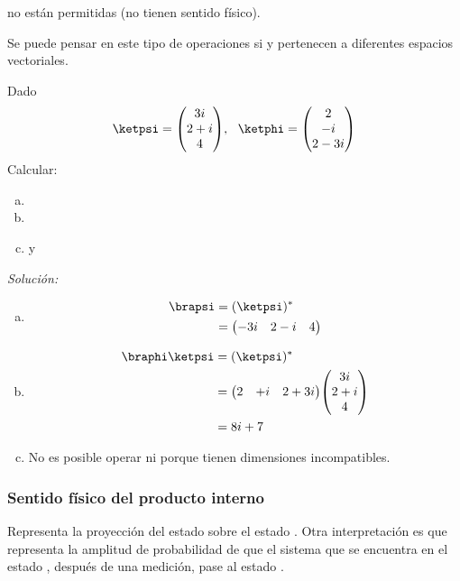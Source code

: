 no están permitidas (no tienen sentido físico).

Se puede pensar en este tipo de operaciones si \ketpsi y \ketphi pertenecen a diferentes espacios vectoriales.

\begin{example}[Operadores]
    Dado
    \[
        \ketpsi=\mqty(3i\\2+i\\4),~~\ketphi=\mqty(2\\-i\\2-3i)
    \]
    Calcular:
    \begin{enumerate}[a) ]
        \item \brapsi
        \item \braphi\ketpsi
        \item \ketpsi\ketphi y \brapsi\braphi
    \end{enumerate}
    
    \textit{Solución:}
    
    \begin{enumerate}[a) ]
        \item 
        \begin{align*}
            \brapsi&=(\ketpsi)^*\\
            &=\mqty(-3i&2-i&4)
        \end{align*}
        \item 
        \begin{align*}
            \braphi\ketpsi&=(\ketpsi)^*\\
            &=\mqty(2&+i&2+3i)\mqty(3i\\2+i\\4)\\
            &=8i+7
        \end{align*}
        \item No es posible operar \ketpsi\ketphi ni \brapsi\braphi porque tienen dimensiones incompatibles.
    \end{enumerate}
\end{example}

\subsubsection{Sentido físico del producto interno}
\braketba Representa la proyección del estado \ketpsi sobre el estado \ketphi. Otra interpretación es que representa la amplitud de probabilidad de que el sistema que se encuentra en el estado \ketpsi, después de una medición, pase al estado \ketphi.

